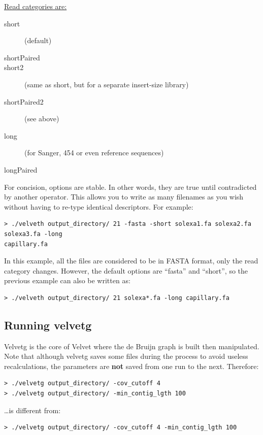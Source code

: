 \documentclass{article}
\begin{document}
\underline{Read categories are:}
\begin{description}
\item[short] (default)
\item[shortPaired]
\item[short2] (same as short, but for a separate insert-size library)
\item[shortPaired2] (see above) 
\item[long] (for Sanger, 454 or even reference sequences)
\item[longPaired]
\end{description}

For concision, options are stable. In other words, they are true until
contradicted by another operator. This allows you to write as many filenames
as you wish without having to re-type identical descriptors.  For example:
\begin{verbatim}
> ./velveth output_directory/ 21 -fasta -short solexa1.fa solexa2.fa solexa3.fa -long
capillary.fa
\end{verbatim}

In this example, all the files are considered to be in FASTA format,
only the read category changes. However, the default options are ``fasta'' and ``short'', so the previous example
can also be written as:

\begin{verbatim}
> ./velveth output_directory/ 21 solexa*.fa -long capillary.fa
\end{verbatim}

\subsection{Running velvetg}

Velvetg is the core of Velvet where the de Bruijn graph is built then manipulated. Note that although velvetg saves some files during the process to avoid useless recalculations, the parameters are \textbf{not} saved from one run to the next. Therefore:

\begin{verbatim}
> ./velvetg output_directory/ -cov_cutoff 4
> ./velvetg output_directory/ -min_contig_lgth 100
\end{verbatim}

\ldots is different from:

\begin{verbatim}
> ./velvetg output_directory/ -cov_cutoff 4 -min_contig_lgth 100
\end{verbatim}
\end{document}
